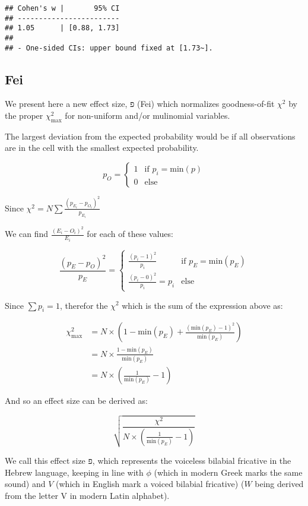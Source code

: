 \documentclass[
]{article}
\begin{document}
\begin{verbatim}
## Cohen's w |       95% CI
## ------------------------
## 1.05      | [0.88, 1.73]
## 
## - One-sided CIs: upper bound fixed at [1.73~].
\end{verbatim}

\hypertarget{fei}{%
\subsection{Fei}\label{fei}}

We present here a new effect size, \(פ\) (Fei) which normalizes
goodness-of-fit \(\chi^2\) by the proper \(\chi^2_\text{max}\) for
non-uniform and/or mulinomial variables.

The largest deviation from the expected probability would be if all
observations are in the cell with the smallest expected probability.

\[
p_{O} = 
\begin{cases}
1 & \text{if } p_i = \text{min}(p) \\
0 & \text{else}
\end{cases}
\]

Since \(\chi^2 = N \sum{\frac{(p_{E_i}-p_{O_i})^2}{p_{E_i}}}\)

We can find \(\frac{(E_i-O_i)^2}{E_i}\) for each of these values:

\[
\frac{(p_{E}-p_{O})^2}{p_{E}} = 
\begin{cases}
\frac{(p_i-1)^2}{p_i} & \text{if } p_{E} = \text{min}(p_{E}) \\
\frac{(p_i-0)^2}{p_i} = p_i & \text{else}
\end{cases}
\]

Since \(\sum{p_i}=1\), therefor the \(\chi^2\) which is the sum of the
expression above as:

\[
\begin{split}
\chi^2_\text{max} & = N \times (1 - \text{min}(p_E) + \frac{(\text{min}(p_E)-1)^2}{\text{min}(p_E)}) \\
 & = N \times \frac{1-\text{min}(p_E)}{\text{min}(p_E)} \\
 & = N \times (\frac{1}{\text{min}(p_E)} - 1)
\end{split}
\]

And so an effect size can be derived as:

\[
\sqrt{\frac{\chi^2}{N \times (\frac{1}{\text{min}(p_E)} - 1)}}
\]

We call this effect size \(פ\), which represents the voiceless bilabial
fricative in the Hebrew language, keeping in line with \(\phi\) (which
in modern Greek marks the same sound) and \(V\) (which in English mark a
voiced bilabial fricative) (\(W\) being derived from the letter V in
modern Latin alphabet).
\end{document}
